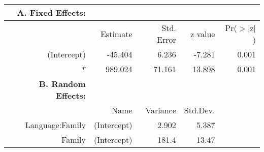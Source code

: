 \begin{tabular}{rrrrr}
 {\bf A. Fixed Effects:} \\
\hline
 & Estimate & Std. Error & z value & Pr($>$$|$z$|$) \\ 
  \hline
(Intercept) & -45.404 & 6.236 & -7.281 & 0.001 \\ 
  $r$ & 989.024 & 71.161 & 13.898 & 0.001 \\ 

\hline \hline
{\bf B. Random Effects:} \\
\hline
& Name & Variance & Std.Dev. \\
\hline
Language:Family & (Intercept) & 2.902 & 5.387 \\
Family & (Intercept) & 181.4 & 13.47 \\
\end{tabular}
